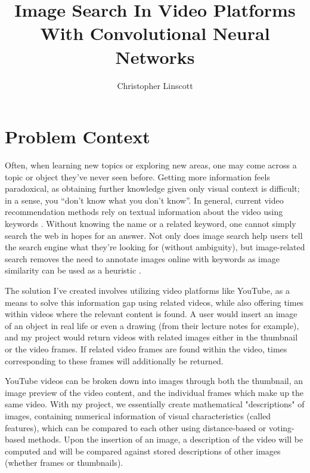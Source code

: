 \documentclass[10pt,twocolumn]{article}
\title{Image Search In Video Platforms With Convolutional Neural Networks}
\author{Christopher Linscott}
\affiliation{Occidental College}
\begin{document}
\maketitle


\section{Problem Context}

Often, when learning new topics or exploring new areas, one may come across a topic or object they’ve never seen before. Getting more information feels paradoxical, as obtaining further knowledge given only visual context is difficult; in a sense, you “don’t know what you don’t know”. In general, current video recommendation methods rely on textual information about the video using keywords \cite{Stanford2021}. Without knowing the name or a related keyword, one cannot simply search the web in hopes for an answer. Not only does image search help users tell the search engine what they’re looking for (without ambiguity), but image-related search removes the need to annotate images online with keywords as image similarity can be used as a heuristic \cite{Adrakatti2016}.

The solution I've created involves utilizing video platforms like YouTube, as a means to solve this information gap using related videos, while also offering times within videos where the relevant content is found. A user would insert an image of an object in real life or even a drawing (from their lecture notes for example), and my project would return videos with related images either in the thumbnail or the video frames. If related video frames are found within the video, times corresponding to these frames will additionally be returned.

YouTube videos can be broken down into images through both the thumbnail, an image preview of the video content, and the individual frames which make up the same video. With my project, we essentially create mathematical "descriptions" of images, containing numerical information of visual characteristics (called features), which can be compared to each other using distance-based or voting-based methods. 
Upon the insertion of an image, a description of the video will be computed and will be compared against stored descriptions of other images (whether frames or thumbnails).
\end{document}
